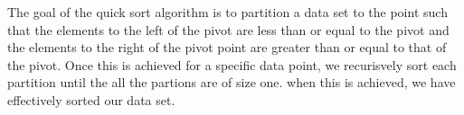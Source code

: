 \documentclass[a4paper,9pt]{article}
\begin{document}
\begin{highlight}
    \noindent The goal of the quick sort algorithm is to partition a data set to the point such that the elements to the left of the pivot are less than or equal to the pivot and the elements to the right of 
    the pivot point are greater than or equal to that of the pivot. Once this is achieved for a specific data point, we recurisvely sort each partition until the all the partions are of size one. when
    this is achieved, we have effectively sorted our data set.
\end{highlight}
\end{document}
